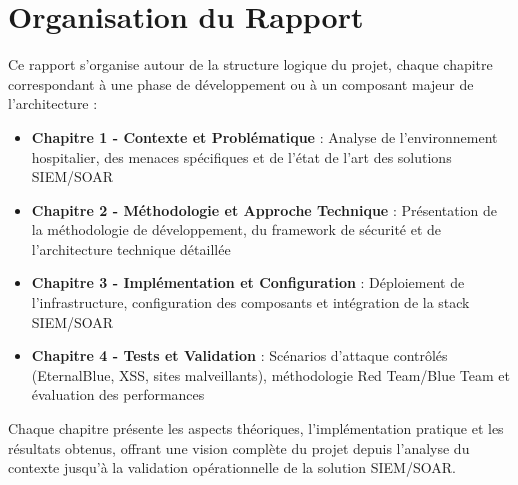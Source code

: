 \section{Organisation du Rapport}

Ce rapport s'organise autour de la structure logique du projet, chaque chapitre correspondant à une phase de développement ou à un composant majeur de l'architecture :

\begin{itemize}
    \item \textbf{Chapitre 1 - Contexte et Problématique} : Analyse de l'environnement hospitalier, des menaces spécifiques et de l'état de l'art des solutions SIEM/SOAR
    \item \textbf{Chapitre 2 - Méthodologie et Approche Technique} : Présentation de la méthodologie de développement, du framework de sécurité et de l'architecture technique détaillée
    \item \textbf{Chapitre 3 - Implémentation et Configuration} : Déploiement de l'infrastructure, configuration des composants et intégration de la stack SIEM/SOAR
    \item \textbf{Chapitre 4 - Tests et Validation} : Scénarios d'attaque contrôlés (EternalBlue, XSS, sites malveillants), méthodologie Red Team/Blue Team et évaluation des performances
\end{itemize}

Chaque chapitre présente les aspects théoriques, l'implémentation pratique et les résultats obtenus, offrant une vision complète du projet depuis l'analyse du contexte jusqu'à la validation opérationnelle de la solution SIEM/SOAR.

\newpage
